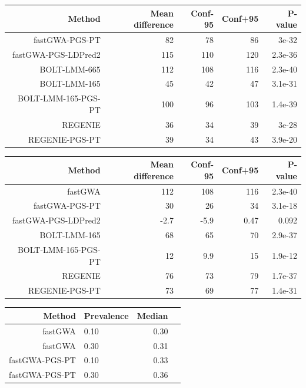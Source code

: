 \documentclass[10pt]{article}
\begin{document}
\begin{table}[ht]
\centering
{}
\begin{tabular}{rrrrr}
  \hline
Method & Mean difference & Conf-95 & Conf+95 & P-value \\ 
  \hline
  fastGWA-PGS-PT &  82 &  78 &  86 & 3e-32 \\
  fastGWA-PGS-LDPred2 & 115 & 110 & 120 & 2.3e-36 \\ 
  BOLT-LMM-665 & 112 & 108 & 116 & 2.3e-40 \\ 
  BOLT-LMM-165 &  45 &  42 &  47 & 3.1e-31 \\ 
  BOLT-LMM-165-PGS-PT & 100 &  96 & 103 & 1.4e-39 \\ 
  REGENIE &  36 &  34 &  39 & 3e-28 \\ 
  REGENIE-PGS-PT &  39 &  34 &  43 & 3.9e-20 \\ 
   \hline
\end{tabular}
\end{table}




\begin{table}[!htb]
\centering
{}
\begin{tabular}{rrrrr}
  \hline
 Method & Mean difference & Conf-95 & Conf+95 & P-value \\ 
  \hline
fastGWA & 112 & 108 & 116 & 2.3e-40 \\ 
  fastGWA-PGS-PT &  30 &  26 &  34 & 3.1e-18 \\
  fastGWA-PGS-LDPred2 & -2.7 & -5.9 & 0.47 & 0.092 \\ 
 
  BOLT-LMM-165 &  68 &  65 &  70 & 2.9e-37 \\ 
  BOLT-LMM-165-PGS-PT &  12 & 9.9 &  15 & 1.9e-12 \\ 
  REGENIE &  76 &  73 &  79 & 1.7e-37 \\ 
  REGENIE-PGS-PT &  73 &  69 &  77 & 1.4e-31 \\ 
   \hline
\end{tabular}
\end{table}



\begin{table}[!htb]
\centering
{}
\begin{tabular}{rlrr}
  \hline
 Method & Prevalence & Median \\ 
  \hline
fastGWA & 0.10 & 0.30 \\ 
  fastGWA & 0.30 & 0.31 \\ 
  fastGWA-PGS-PT & 0.10 & 0.33 \\ 
  fastGWA-PGS-PT & 0.30 & 0.36 \\ 
   \hline
\end{tabular}
\end{table}
\end{document}
